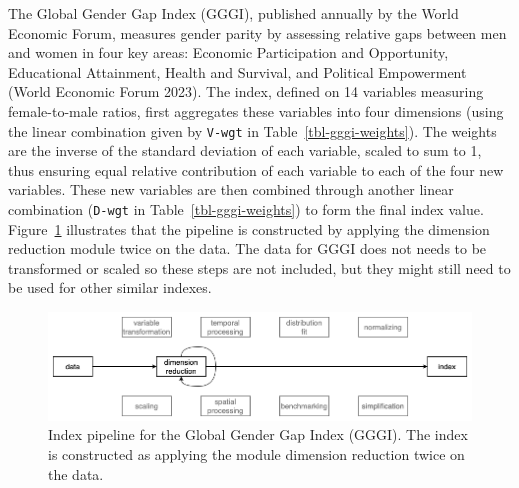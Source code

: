 \documentclass[
]{interact}
\begin{document}
The Global Gender Gap Index (GGGI), published annually by the World
Economic Forum, measures gender parity by assessing relative gaps
between men and women in four key areas: Economic Participation and
Opportunity, Educational Attainment, Health and Survival, and Political
Empowerment (World Economic Forum 2023). The index, defined on 14
variables measuring female-to-male ratios, first aggregates these
variables into four dimensions (using the linear combination given by
\texttt{V-wgt} in Table~\ref{tbl-gggi-weights}). The weights are the
inverse of the standard deviation of each variable, scaled to sum to 1,
thus ensuring equal relative contribution of each variable to each of
the four new variables. These new variables are then combined through
another linear combination (\texttt{D-wgt} in
Table~\ref{tbl-gggi-weights}) to form the final index value.
Figure~\ref{fig-pp-gggi} illustrates that the pipeline is constructed by
applying the dimension reduction module twice on the data. The data for
GGGI does not needs to be transformed or scaled so these steps are not
included, but they might still need to be used for other similar
indexes.

\begin{figure}

{\centering \includegraphics[width=1\textwidth,height=0.9\textheight]{figures/pipeline-gggi.png}

}

\caption{\label{fig-pp-gggi}Index pipeline for the Global Gender Gap
Index (GGGI). The index is constructed as applying the module dimension
reduction twice on the data.}

\end{figure}
\end{document}
